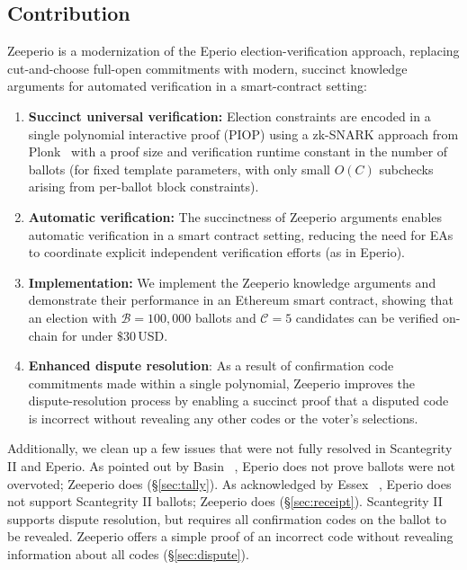 \subsection{Contribution}

Zeeperio is a modernization of the Eperio election-verification approach, replacing cut-and-choose full-open commitments with modern, succinct knowledge arguments for automated verification in a smart-contract setting:

\begin{enumerate}
 	\item \textbf{Succinct universal verification:} Election constraints are encoded in a single polynomial interactive proof (PIOP) using a zk-SNARK approach from Plonk~\cite{GWC19} with a proof size and verification runtime constant in the number of ballots (for fixed template parameters, with only small $O(C)$ subchecks arising from per-ballot block constraints).
 	\item \textbf{Automatic verification:} The succinctness of Zeeperio arguments enables automatic verification in a smart contract setting, reducing the need for EAs to coordinate explicit independent verification efforts (as in Eperio).
 	\item \textbf{Implementation:} We implement the Zeeperio knowledge arguments and demonstrate their performance in an Ethereum smart contract, showing that an election with $\mathcal{B}=100{,}000$ ballots and $\mathcal{C}=5$ candidates can be verified on-chain for under $\$30\,$USD.
 	\item \textbf{Enhanced dispute resolution}: As a result of confirmation code commitments made within a single polynomial, Zeeperio improves the dispute-resolution process by enabling a succinct proof that a disputed code is incorrect without revealing any other codes or the voter’s selections.
 \end{enumerate}
 
\noindent Additionally, we clean up a few issues that were not fully resolved in Scantegrity II and Eperio. As pointed out by Basin \etal~\cite{BDGR21}, Eperio does not prove ballots were not overvoted; Zeeperio does (\S\ref{sec:tally}). As acknowledged by Essex \etal~\cite{ECHA10}, Eperio does not support Scantegrity II ballots; Zeeperio does (\S\ref{sec:receipt}). Scantegrity II~\cite{CCC+08} supports dispute resolution, but requires all confirmation codes on the ballot to be revealed. Zeeperio offers a simple proof of an incorrect code without revealing information about all codes (\S\ref{sec:dispute}).


